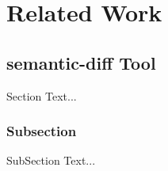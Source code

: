 
\chapter{Related Work}\label{chapter:relatedWork}

\section{semantic-diff Tool}
Section Text...
\subsection{Subsection}
SubSection Text...


